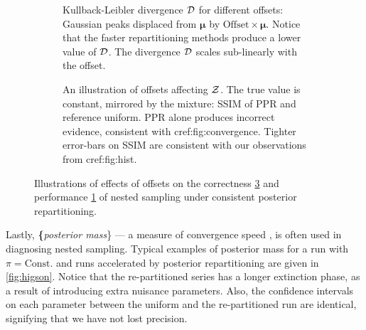 \documentclass[draft,usenatbib]{mnras}
\begin{document}
\begin{figure} \centering
\begin{subfigure}{0.99\columnwidth}
\centering


\caption{Kullback-Leibler divergence \({\cal D}\) for different
offsets: Gaussian peaks displaced from \(\bm{\mu}\) by
\(\text{Offset}\times \bm{\mu}\). Notice that the faster
repartitioning methods produce a lower value of \({\cal
D}\). The divergence \({\cal D}\) scales sub-linearly with the
offset.\label{fig:kl-d}}
\end{subfigure}

\begin{subfigure}{0.99\columnwidth}
\centering



\caption{An illustration of offsets affecting ${\cal Z}$. The true
value is constant, mirrored by the mixture: SSIM of PPR and
reference uniform. PPR alone produces incorrect evidence,
consistent with cref:fig:convergence. Tighter error-bars on SSIM
are consistent with our observations from
cref:fig:hist.\label{fig:drift}}
\end{subfigure}
\caption{Illustrations of effects of offsets on the correctness
\ref{fig:drift} and performance \ref{fig:kl-d} of nested sampling
under consistent posterior repartitioning.}
\end{figure}




Lastly, \textbf\{\emph{posterior mass}\} --- a measure of convergence
speed \citep{higson2018nestcheck}, is often used in diagnosing nested
sampling. Typical examples of posterior mass for a run with
\(\pi=\text{Const.}\) and runs accelerated by posterior repartitioning
are given in \cref{fig:higson}. Notice that the re-partitioned series
has a longer extinction phase, as a result of introducing extra
nuisance parameters. Also, the confidence intervals on each parameter
between the uniform and the re-partitioned run are identical,
signifying that we have not lost precision.
\end{document}
